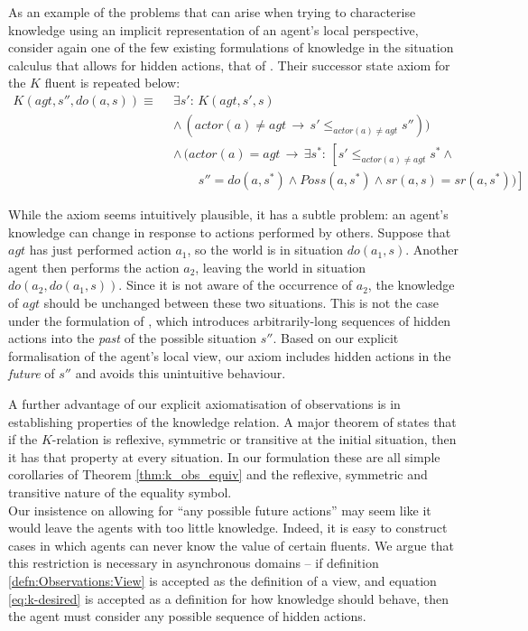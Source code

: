 As an example of the problems that can arise when trying to characterise
knowledge using an implicit representation of an agent's local perspective,
consider again one of the few existing formulations of knowledge in
the situation calculus that allows for hidden actions, that of \citep{Lesperance99sitcalc_approach}.
Their successor state axiom for the $K$ fluent is repeated below:\begin{align*}
K(agt,s'',do(a,s))\equiv\,\,\, & \exists s':\, K(agt,s',s)\\
 & \wedge\,(actor(a)\neq agt\,\rightarrow\, s'\leq_{actor(a)\neq agt}s''))\\
 & \wedge\,(actor(a)=agt\,\rightarrow\,\exists s^{*}:\,\left[s'\leq_{actor(a)\neq agt}s^{*}\wedge\right.\\
 & \,\,\,\,\,\,\,\,\,\,\,\,\left.s''=do(a,s^{*})\wedge Poss(a,s^{*})\wedge sr(a,s)=sr(a,s^{*}))\right]\end{align*}


While the axiom seems intuitively plausible, it has a subtle problem:
an agent's knowledge can change in response to actions performed by
others. Suppose that $agt$ has just performed action $a_{1}$, so
the world is in situation $do(a_{1},s)$. Another agent then performs
the action $a_{2}$, leaving the world in situation $do(a_{2},do(a_{1},s))$.
Since it is not aware of the occurrence of $a_{2}$, the knowledge
of $agt$ should be unchanged between these two situations. This is
not the case under the formulation of \citep{Lesperance99sitcalc_approach},
which introduces arbitrarily-long sequences of hidden actions into
the \emph{past} of the possible situation $s''$. Based on our explicit
formalisation of the agent's local view, our axiom includes hidden
actions in the \emph{future} of $s''$ and avoids this unintuitive
behaviour.

A further advantage of our explicit axiomatisation of observations
is in establishing properties of the knowledge relation. A major theorem
of \citep{scherl03sc_knowledge} states that if the $K$-relation
is reflexive, symmetric or transitive at the initial situation, then
it has that property at every situation. In our formulation these
are all simple corollaries of Theorem \ref{thm:k_obs_equiv} and the
reflexive, symmetric and transitive nature of the equality symbol.\\


Our insistence on allowing for {}``any possible future actions''
may seem like it would leave the agents with too little knowledge.
Indeed, it is easy to construct cases in which agents can never know
the value of certain fluents. We argue that this restriction is necessary
in asynchronous domains -- if definition \ref{defn:Observations:View}
is accepted as the definition of a view, and equation \eqref{eq:k-desired}
is accepted as a definition for how knowledge should behave, then
the agent must consider any possible sequence of hidden actions.

